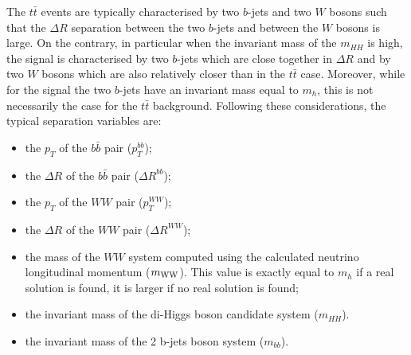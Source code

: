 The $t \bar{t}$ events are typically characterised by two $b$-jets and
two $W$ bosons such that the $\Delta R$ separation between the two
$b$-jets and between the $W$ bosons is large. On the contrary, in particular
when the invariant mass of the $m_{HH}$ is high, the signal is characterised
by two $b$-jets which are close together in $\Delta R$ and by two $W$ bosons
which are also relatively closer than in the $t \bar{t}$
case. Moreover, while for the signal the two $b$-jets have an
invariant mass equal to $m_h$, this is not necessarily the case for the $t \bar{t}$ background.  Following these considerations, the typical separation variables are: 
\begin{itemize}
\item the $p_T$ of the $b \bar{b}$ pair ($p_T^{bb}$);
\item the $\Delta R$ of the $b \bar{b}$ pair ($\Delta R^{bb}$);
\item the $p_T$ of the $WW$ pair ($p_T^{WW}$);
\item the $\Delta R$ of the $WW$ pair ($\Delta R^{WW}$);
\item the mass of the $WW$ system computed using the calculated neutrino
      longitudinal momentum ($m_{\rm WW}$). This value is exactly equal to $m_h$
      if a real solution is found, it is larger if no real solution is found;
\item the invariant mass of the di-Higgs boson candidate system ($m_{HH}$). 
\item the invariant mass of the 2 b-jets boson system ($m_{bb}$). 

\end{itemize}


